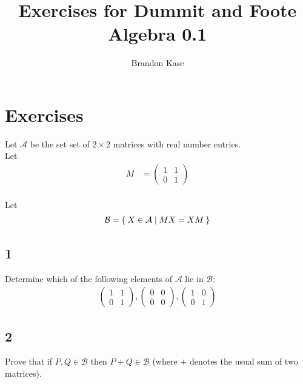 \documentclass[12pt]{article}
\begin{document}
 
\title{Exercises for Dummit and Foote Algebra 0.1}
\author{Brandon Kase}
\maketitle
 
\section*{Exercises}

Let $\mathcal{A}$ be the set set of $2 \times 2$ matrices with real number entries. \\

Let
\begin{align*}
M &= \begin{pmatrix}
1 & 1 \\
0 & 1
\end{pmatrix}
\end{align*} \\

Let
\begin{align*}
\mathcal{B} = \Set{X \in \mathcal{A} | M X = X M}
\end{align*}

\subsection*{1}
Determine which of the following elements of $\mathcal{A}$ lie in $\mathcal{B}$: \\

\begin{align*}
\begin{pmatrix}
1 & 1 \\
0 & 1
\end{pmatrix},
\begin{pmatrix}
0 & 0 \\
0 & 0
\end{pmatrix},
\begin{pmatrix}
1 & 0 \\
0 & 1
\end{pmatrix}
\end{align*}

\subsection*{2}

Prove that if $P,Q \in \mathcal{B}$ then $P + Q \in \mathcal{B}$ (where $+$ denotes the usual sum of two matrices).
\end{document}
